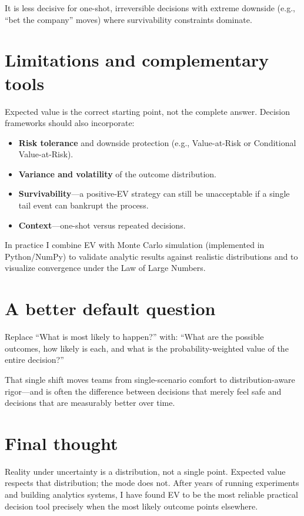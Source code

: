 \documentclass[11pt,a4paper]{article}
\begin{document}
It is less decisive for one-shot, irreversible decisions with extreme downside (e.g., “bet the company” moves) where survivability constraints dominate.

\section{Limitations and complementary tools}

Expected value is the correct starting point, not the complete answer. Decision frameworks should also incorporate:
\begin{itemize}
    \item \textbf{Risk tolerance} and downside protection (e.g., Value-at-Risk or Conditional Value-at-Risk).
    \item \textbf{Variance and volatility} of the outcome distribution.
    \item \textbf{Survivability}—a positive-EV strategy can still be unacceptable if a single tail event can bankrupt the process.
    \item \textbf{Context}—one-shot versus repeated decisions.
\end{itemize}

In practice I combine EV with Monte Carlo simulation (implemented in Python/NumPy) to validate analytic results against realistic distributions and to visualize convergence under the Law of Large Numbers.

\section{A better default question}

Replace “What is most likely to happen?” with:  
“What are the possible outcomes, how likely is each, and what is the probability-weighted value of the entire decision?”

That single shift moves teams from single-scenario comfort to distribution-aware rigor—and is often the difference between decisions that merely feel safe and decisions that are measurably better over time.

\section{Final thought}

Reality under uncertainty is a distribution, not a single point. Expected value respects that distribution; the mode does not. After years of running experiments and building analytics systems, I have found EV to be the most reliable practical decision tool precisely when the most likely outcome points elsewhere.
\end{document}
